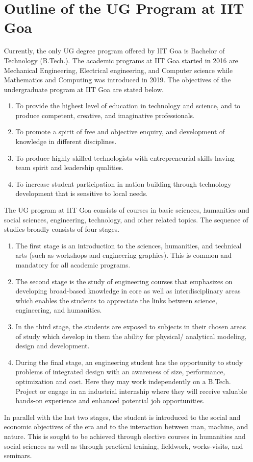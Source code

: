 \section{Outline of the UG Program at IIT Goa}
	
	Currently, the only UG degree program offered by IIT Goa is Bachelor of Technology (B.Tech.). The academic programs at IIT Goa started in 2016 are Mechanical Engineering, Electrical engineering, and Computer science while Mathematics and Computing was introduced in 2019. The objectives of the undergraduate program at IIT Goa are stated below.
	
	\begin{enumerate}
	\item To provide the highest level of education in technology and science, and to produce competent, creative, and imaginative professionals.
	\item To promote a spirit of free and objective enquiry, and development of knowledge in different disciplines. 
	\item To produce highly skilled technologists with entrepreneurial skills having team spirit and leadership qualities. 
	\item To increase student participation in nation building through technology development that is sensitive to local needs.
	\end{enumerate}
	 
	The UG program at IIT Goa consists of courses in basic sciences, humanities and social sciences, engineering, technology, and other related topics. The sequence of studies broadly consists of four stages.
	\begin{enumerate}
		 
	\item The first stage is an introduction to the sciences, humanities, and technical arts (such as workshops and engineering graphics). This is common and mandatory for all academic programs. 
	\item The second stage is the study of engineering courses that emphasizes on developing broad-based knowledge in core as well as interdisciplinary areas which enables the students to appreciate the links between science, engineering, and humanities. 
	\item In the third stage, the students are exposed to subjects in their chosen areas of study which develop in them the ability for physical/ analytical modeling, design and development. 
	\item During the final stage, an engineering student has the opportunity to study problems of integrated design with an awareness of size, performance, optimization and cost. Here they may work independently on a B.Tech. Project or engage in an industrial internship where they will receive valuable hands-on experience and enhanced potential job opportunities.
\end{enumerate}

	In parallel with the last two stages, the student is introduced to the social and economic objectives of the era and to the interaction between man, machine, and nature. This is sought to be achieved through elective courses in humanities and social sciences as well as through practical training, fieldwork, works-visits, and seminars. 